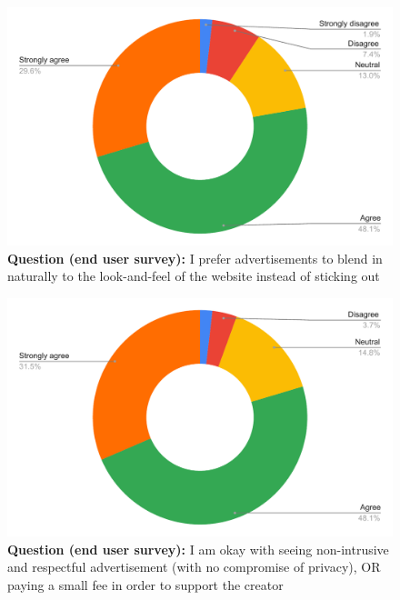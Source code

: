 \begin{figure}[H]
  \centering
  \includegraphics[width=13cm]{thesis/paper/images/p2u_q3.pdf}
  \textbf{Question (end user survey):} I prefer advertisements to blend in naturally to the look-and-feel of the website instead of sticking out
\end{figure}

\begin{figure}[H]
  \centering
  \includegraphics[width=13cm]{thesis/paper/images/p2u_q4.pdf}
  \textbf{Question (end user survey):} I am okay with seeing non-intrusive and respectful advertisement (with no compromise of privacy), OR paying a small fee in order to support the creator
\end{figure}

